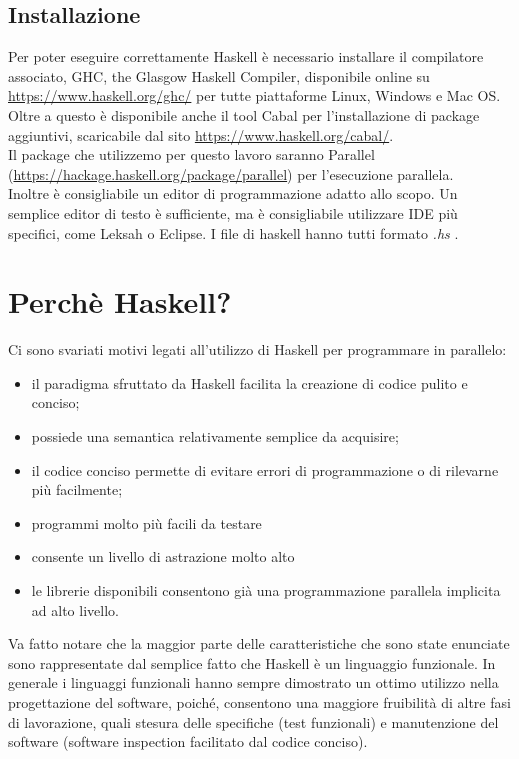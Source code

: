 \subsection{Installazione}
Per poter eseguire correttamente Haskell è necessario installare il compilatore associato, GHC, the Glasgow Haskell Compiler, disponibile online su \url{https://www.haskell.org/ghc/} per tutte piattaforme Linux, Windows e Mac OS.\\
Oltre a questo è disponibile anche il tool Cabal per l'installazione di package aggiuntivi, scaricabile dal sito \url{https://www.haskell.org/cabal/}.\\
Il package che utilizzemo per questo lavoro saranno Parallel (\url{https://hackage.haskell.org/package/parallel}) per l'esecuzione parallela.\\
Inoltre è consigliabile un editor di programmazione adatto allo scopo. Un semplice editor di testo è sufficiente, ma è consigliabile utilizzare IDE più specifici, come Leksah o Eclipse. I file di haskell hanno tutti formato \textit{.hs} .
\section{Perchè Haskell?}
Ci sono svariati motivi legati all'utilizzo di Haskell per programmare in parallelo:
\begin{itemize}
\item{il paradigma sfruttato da Haskell facilita la creazione di codice pulito e conciso;}
\item{possiede una semantica relativamente semplice da acquisire;}
\item{il codice conciso permette di evitare errori di programmazione o di rilevarne più facilmente;}
\item{programmi molto più facili da testare}
\item{consente un livello di astrazione molto alto}
\item{le librerie disponibili consentono già una programmazione parallela implicita ad alto livello.}
\end{itemize}
Va fatto notare che la maggior parte delle caratteristiche che sono state enunciate sono rappresentate dal semplice fatto che Haskell è un linguaggio funzionale. In generale i linguaggi funzionali hanno sempre dimostrato un ottimo utilizzo nella progettazione del software, poiché, consentono una maggiore fruibilità di altre fasi di lavorazione, quali stesura delle specifiche (test funzionali) e manutenzione del software (software inspection facilitato dal codice conciso).\\
